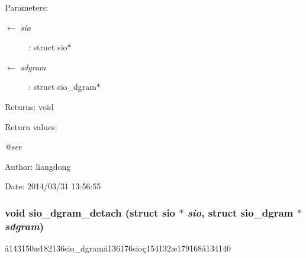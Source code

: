 \begin{Desc}
\item[Parameters:]
\begin{description}
\item[\mbox{$\leftarrow$} {\em sio}]: struct sio$\ast$ \item[\mbox{$\leftarrow$} {\em sdgram}]: struct sio\_\-dgram$\ast$ \end{description}
\end{Desc}
\begin{Desc}
\item[Returns:]void \end{Desc}
\begin{Desc}
\item[Return values:]
\begin{description}
\item[{\em @see}]\end{description}
\end{Desc}
\begin{Desc}
\item[Author:]liangdong \end{Desc}
\begin{Desc}
\item[Date:]2014/03/31 13:56:55 \end{Desc}
\subsubsection{\setlength{\rightskip}{0pt plus 5cm}void sio\_\-dgram\_\-detach (struct sio $\ast$ {\em sio}, struct sio\_\-dgram $\ast$ {\em sdgram})}\label{sio__dgram_8c_a7}


\aa{}143150\ae{}182136sio\_\-dgram\aa{}136176sio\c{c}154132\ae{}179168\aa{}134140 

